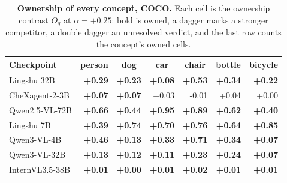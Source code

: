 \begin{table}[htbp]
\centering
\scriptsize
\setlength{\tabcolsep}{4pt}
\caption{\textbf{Ownership of every concept, COCO.} Each cell is the ownership contrast $O_q$ at $\alpha=+0.25$: bold is owned, a dagger marks a stronger competitor, a double dagger an unresolved verdict, and the last row counts the concept's owned cells.}
\label{tab:cf-own-coco}
\begin{tabular}{lrrrrrr}
\toprule
Checkpoint & \multicolumn{1}{c}{person} & \multicolumn{1}{c}{dog} & \multicolumn{1}{c}{car} & \multicolumn{1}{c}{chair} & \multicolumn{1}{c}{bottle} & \multicolumn{1}{c}{bicycle}\\
\midrule
Lingshu 32B & \cellcolor{cfSlate4}\textbf{+0.29} & \cellcolor{cfSlate3}\textbf{+0.23} & \cellcolor{cfSlate2}\textbf{+0.08} & \cellcolor{cfSlate4}\textbf{+0.53} & \cellcolor{cfSlate4}\textbf{+0.34} & \cellcolor{cfSlate3}\textbf{+0.22} \\
CheXagent-2-3B & \cellcolor{cfSlate2}\textbf{+0.07} & \cellcolor{cfSlate2}\textbf{+0.07} & \cellcolor{cfSlate2}+0.03 & \cellcolor{cfTerra1}-0.01 & \cellcolor{cfSlate2}+0.04 & \cellcolor{cfSlate1}+0.00 \\
Qwen2.5-VL-72B & \cellcolor{cfSlate4}\textbf{+0.66} & \cellcolor{cfSlate4}\textbf{+0.44} & \cellcolor{cfSlate4}\textbf{+0.95} & \cellcolor{cfSlate4}\textbf{+0.89} & \cellcolor{cfSlate4}\textbf{+0.62} & \cellcolor{cfSlate4}\textbf{+0.40} \\
Lingshu 7B & \cellcolor{cfSlate4}\textbf{+0.39} & \cellcolor{cfSlate4}\textbf{+0.74} & \cellcolor{cfSlate4}\textbf{+0.70} & \cellcolor{cfSlate4}\textbf{+0.76} & \cellcolor{cfSlate4}\textbf{+0.64} & \cellcolor{cfSlate4}\textbf{+0.85} \\
Qwen3-VL-4B & \cellcolor{cfSlate4}\textbf{+0.46} & \cellcolor{cfSlate3}\textbf{+0.13} & \cellcolor{cfSlate4}\textbf{+0.33} & \cellcolor{cfSlate4}\textbf{+0.71} & \cellcolor{cfSlate4}\textbf{+0.34} & \cellcolor{cfSlate2}\textbf{+0.07} \\
Qwen3-VL-32B & \cellcolor{cfSlate3}\textbf{+0.13} & \cellcolor{cfSlate3}\textbf{+0.12} & \cellcolor{cfSlate3}\textbf{+0.11} & \cellcolor{cfSlate3}\textbf{+0.23} & \cellcolor{cfSlate3}\textbf{+0.24} & \cellcolor{cfSlate2}\textbf{+0.07} \\
InternVL3.5-38B & \cellcolor{cfSlate1}\textbf{+0.01} & \cellcolor{cfSlate1}\textbf{+0.00} & \cellcolor{cfSlate1}\textbf{+0.01} & \cellcolor{cfSlate1}\textbf{+0.02} & \cellcolor{cfSlate1}\textbf{+0.01} & \cellcolor{cfSlate1}\textbf{+0.01} \\

\end{tabular}
\end{table}
